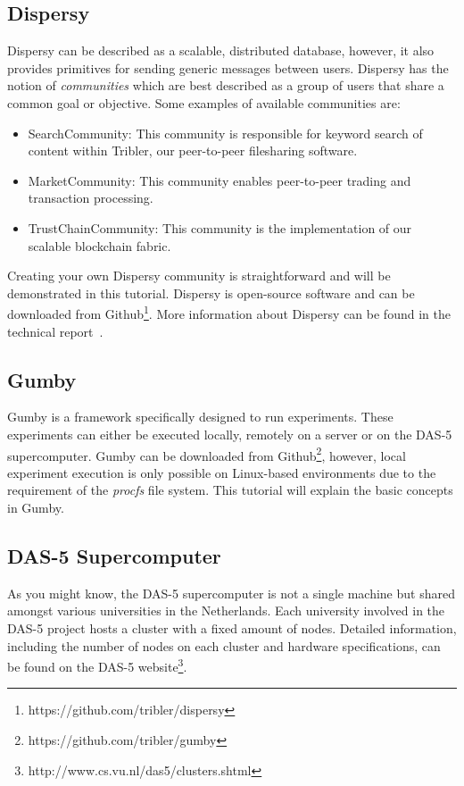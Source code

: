 \documentclass{article}
\begin{document}
\subsection{Dispersy}
Dispersy can be described as a scalable, distributed database, however, it also provides primitives for sending generic messages between users.
Dispersy has the notion of \emph{communities} which are best described as a group of users that share a common goal or objective.
Some examples of available communities are:
\begin{itemize}
	\item SearchCommunity: This community is responsible for keyword search of content within Tribler, our peer-to-peer filesharing software.
	\item MarketCommunity: This community enables peer-to-peer trading and transaction processing.
	\item TrustChainCommunity: This community is the implementation of our scalable blockchain fabric.
\end{itemize}

Creating your own Dispersy community is straightforward and will be demonstrated in this tutorial.
Dispersy is open-source software and can be downloaded from Github\footnote{https://github.com/tribler/dispersy}.
More information about Dispersy can be found in the technical report~\cite{zeilemaker2013dispersy}.

\subsection{Gumby}
Gumby is a framework specifically designed to run experiments.
These experiments can either be executed locally, remotely on a server or on the DAS-5 supercomputer.
Gumby can be downloaded from Github\footnote{https://github.com/tribler/gumby}, however, local experiment execution is only possible on Linux-based environments due to the requirement of the \emph{procfs} file system.
This tutorial will explain the basic concepts in Gumby.

\subsection{DAS-5 Supercomputer}
As you might know, the DAS-5 supercomputer is not a single machine but shared amongst various universities in the Netherlands.
Each university involved in the DAS-5 project hosts a cluster with a fixed amount of nodes.
Detailed information, including the number of nodes on each cluster and hardware specifications, can be found on the DAS-5 website\footnote{http://www.cs.vu.nl/das5/clusters.shtml}.
\end{document}
